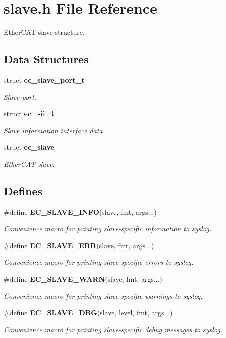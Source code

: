 \section{slave.\-h \-File \-Reference}
\label{slave_8h}


\-Ether\-C\-A\-T slave structure.  


\subsection*{\-Data \-Structures}
\begin{DoxyCompactItemize}
\item 
struct {\bf ec\-\_\-slave\-\_\-port\-\_\-t}
\begin{DoxyCompactList}\small\item\em \-Slave port. \end{DoxyCompactList}\item 
struct {\bf ec\-\_\-sii\-\_\-t}
\begin{DoxyCompactList}\small\item\em \-Slave information interface data. \end{DoxyCompactList}\item 
struct {\bf ec\-\_\-slave}
\begin{DoxyCompactList}\small\item\em \-Ether\-C\-A\-T slave. \end{DoxyCompactList}\end{DoxyCompactItemize}
\subsection*{\-Defines}
\begin{DoxyCompactItemize}
\item 
\#define {\bf \-E\-C\-\_\-\-S\-L\-A\-V\-E\-\_\-\-I\-N\-F\-O}(slave, fmt, args...)
\begin{DoxyCompactList}\small\item\em \-Convenience macro for printing slave-\/specific information to syslog. \end{DoxyCompactList}\item 
\#define {\bf \-E\-C\-\_\-\-S\-L\-A\-V\-E\-\_\-\-E\-R\-R}(slave, fmt, args...)
\begin{DoxyCompactList}\small\item\em \-Convenience macro for printing slave-\/specific errors to syslog. \end{DoxyCompactList}\item 
\#define {\bf \-E\-C\-\_\-\-S\-L\-A\-V\-E\-\_\-\-W\-A\-R\-N}(slave, fmt, args...)
\begin{DoxyCompactList}\small\item\em \-Convenience macro for printing slave-\/specific warnings to syslog. \end{DoxyCompactList}\item 
\#define {\bf \-E\-C\-\_\-\-S\-L\-A\-V\-E\-\_\-\-D\-B\-G}(slave, level, fmt, args...)
\begin{DoxyCompactList}\small\item\em \-Convenience macro for printing slave-\/specific debug messages to syslog. \end{DoxyCompactList}\end{DoxyCompactItemize}

